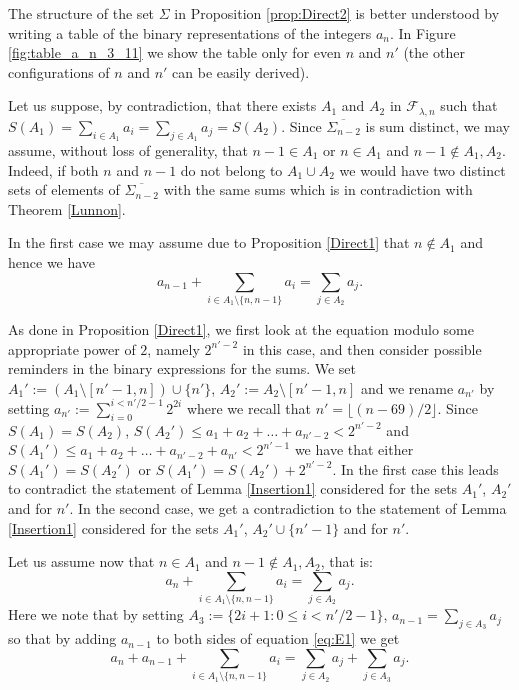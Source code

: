 \documentclass[a4paper]{amsart}
\theoremstyle{plain}
\begin{document}
The structure of the set $\Sigma$ in Proposition \ref{prop:Direct2} is better understood by writing a table of the binary representations of the integers $a_n$. In Figure \ref{fig:table_a_n_3_11} we show the table only for even $n$ and $n'$ (the other configurations of $n$ and $n'$ can be easily derived).

\proof
Let us suppose, by contradiction, that there exists $A_1$ and $A_2$ in $\mathcal{F}_{\lambda,n}$ such that $S(A_1)=\sum_{i\in A_1} a_i=\sum_{j\in A_1} a_j=S(A_2)$.
Since $\overline{\Sigma_{n-2}}$ is sum distinct, we may assume, without loss of generality, that $n-1\in A_1$ or $n\in A_1$ and $n-1\not\in A_1, A_2$. Indeed, if both $n$ and $n-1$ do not belong to $A_1\cup A_2$ we would have two distinct sets of elements of $\overline{\Sigma_{n-2}}$ with the same sums which is in contradiction with Theorem \ref{Lunnon}.

In the first case we may assume due to Proposition \ref{Direct1} that $n \notin A_1$ and hence we have $$a_{n-1}+\sum_{i\in A_1\setminus \{n,n-1\}} a_i=\sum_{j\in A_2}a_j.$$

As done in Proposition \ref{Direct1}, we first look at the equation modulo some appropriate power of $2$, namely $2^{n'-2}$ in this case,  and then consider possible reminders in the binary expressions for the sums. 
We set $A_1':=(A_1\setminus [n'-1,n])\cup \{n'\}$, $A_2':=A_2\setminus [n'-1,n]$ and we rename $a_{n'}$ by setting $a_{n'}:=\sum_{i=0}^{i<n'/2-1} 2^{2i}$ where we recall that $n'=\lfloor(n-69)/2\rfloor$. Since $S(A_1)=S(A_2)$,  $S(A_2') \leq a_1 + a_2 + \ldots + a_{n'-2} < 2^{n'-2}$ and $S(A_1') \leq a_1 + a_2 + \ldots + a_{n'-2} + a_{n'} < 2^{n'-1}$ we have that either $S(A_1')=S(A_2')$ or $S(A_1')=S(A_2')+2^{n'-2}$.  In the first case this leads to contradict the statement of Lemma \ref{Insertion1} considered for the sets $A_1'$,  $A_2'$ and for $n'$.  In the second case,  we get a contradiction to the statement of Lemma \ref{Insertion1} considered for the sets $A_1'$,  $A_2' \cup \{ n'-1 \}$ and for $n'$. 

Let us assume now that $n\in A_1$ and $n-1\not\in A_1, A_2$, that is:
\begin{equation}\label{eq:E1}
a_{n}+\sum_{i\in A_1\setminus \{n,n-1\}} a_i=\sum_{j\in A_2}a_j.
\end{equation}
Here we note that by setting $A_3 := \{ 2i + 1 : 0 \leq i < n'/2 -1 \}$,  $a_{n-1} = \sum_{j \in A_3} a_{j}$ so that by adding $a_{n-1}$ to both sides of equation \eqref{eq:E1} we get
\begin{equation}\label{E2} a_{n}+a_{n-1}+\sum_{i\in A_1\setminus \{n,n-1\}} a_i=\sum_{j\in A_2}a_j+\sum_{j \in A_3} a_{j}.\end{equation}
\end{document}
